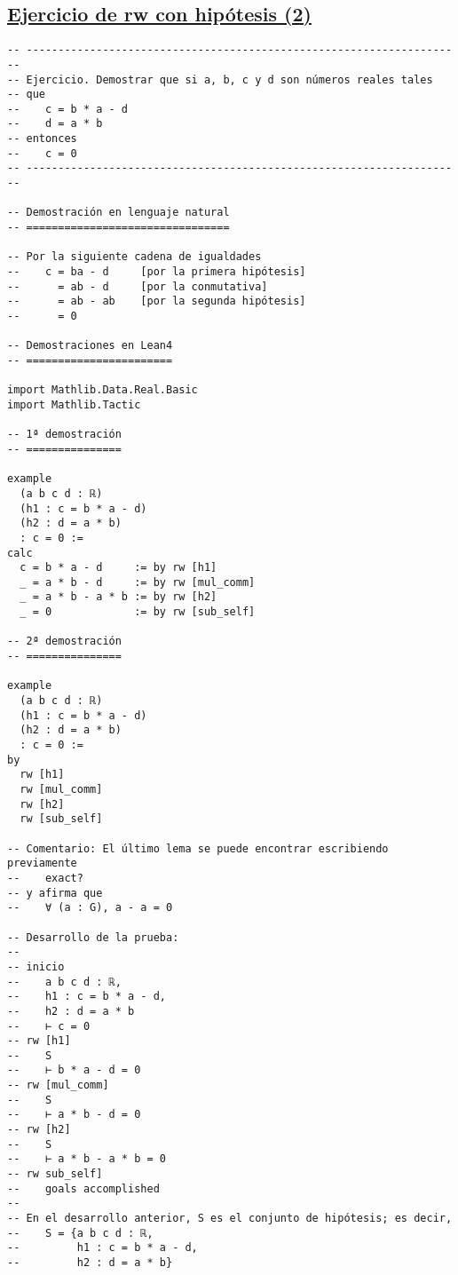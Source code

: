 \subsection{\href{./src/Basicos/Ejercicio\_de\_rw\_sobre\_hipotesis\_2.lean}{Ejercicio de rw con hipótesis (2)}}
\label{sec:org4c446bc}
\begin{verbatim}
-- ---------------------------------------------------------------------
-- Ejercicio. Demostrar que si a, b, c y d son números reales tales
-- que
--    c = b * a - d
--    d = a * b
-- entonces
--    c = 0
-- ---------------------------------------------------------------------

-- Demostración en lenguaje natural
-- ================================

-- Por la siguiente cadena de igualdades
--    c = ba - d     [por la primera hipótesis]
--      = ab - d     [por la conmutativa]
--      = ab - ab    [por la segunda hipótesis]
--      = 0

-- Demostraciones en Lean4
-- =======================

import Mathlib.Data.Real.Basic
import Mathlib.Tactic

-- 1ª demostración
-- ===============

example
  (a b c d : ℝ)
  (h1 : c = b * a - d)
  (h2 : d = a * b)
  : c = 0 :=
calc
  c = b * a - d     := by rw [h1]
  _ = a * b - d     := by rw [mul_comm]
  _ = a * b - a * b := by rw [h2]
  _ = 0             := by rw [sub_self]

-- 2ª demostración
-- ===============

example
  (a b c d : ℝ)
  (h1 : c = b * a - d)
  (h2 : d = a * b)
  : c = 0 :=
by
  rw [h1]
  rw [mul_comm]
  rw [h2]
  rw [sub_self]

-- Comentario: El último lema se puede encontrar escribiendo previamente
--    exact?
-- y afirma que
--    ∀ (a : G), a - a = 0

-- Desarrollo de la prueba:
--
-- inicio
--    a b c d : ℝ,
--    h1 : c = b * a - d,
--    h2 : d = a * b
--    ⊢ c = 0
-- rw [h1]
--    S
--    ⊢ b * a - d = 0
-- rw [mul_comm]
--    S
--    ⊢ a * b - d = 0
-- rw [h2]
--    S
--    ⊢ a * b - a * b = 0
-- rw sub_self]
--    goals accomplished
--
-- En el desarrollo anterior, S es el conjunto de hipótesis; es decir,
--    S = {a b c d : ℝ,
--         h1 : c = b * a - d,
--         h2 : d = a * b}
\end{verbatim}

